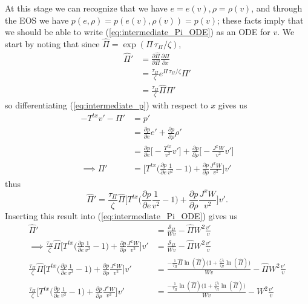 \documentclass[12pt]{article}
\numberwithin{equation}{section}
\begin{document}
At this stage we can recognize that we have $e = e(v), \rho = \rho(v)$, and through the EOS we have $p(e, \rho) = p(e(v), \rho(v)) = p(v)$; these facts imply that we should be able to write (\ref{eq:intermediate_Pi_ODE}) as an ODE for $v$.
We start by noting that since $\hat{\Pi} = \exp(\Pi \, \tau_{\Pi}/\zeta)$,
\begin{equation}
\begin{aligned}
\hat{\Pi}' &= \frac{\partial \hat{\Pi}}{\partial \Pi} \frac{\partial \Pi}{\partial x} \\
&= \frac{\tau_{\Pi}}{\zeta} e^{\Pi \, \tau_{\Pi}/\zeta} \Pi' \\
&= \frac{\tau_{\Pi}}{\zeta} \hat{\Pi} \Pi'
\end{aligned}
\end{equation}
so differentiating (\ref{eq:intermediate_p}) with respect to $x$ gives us
\begin{equation}
\begin{aligned}
- T^{tx} v' - \Pi' &= p' \\
&= \frac{\partial p}{\partial e} e' + \frac{\partial p}{\partial \rho} \rho' \\
&= \frac{\partial p}{\partial e} \Big[ - \frac{T^{tx}}{v^2} v' \Big] + \frac{\partial p}{\partial \rho} \Big[ - \frac{J^x W}{v^2} v' \Big] \\
\implies \Pi' &= \Big[ T^{tx} \Big( \frac{\partial p}{\partial e} \frac{1}{v^2} - 1 \Big) + \frac{\partial p}{\partial \rho} \frac{J^x W}{v^2} \Big] v'
\end{aligned}
\end{equation}
thus
\begin{equation}
\hat{\Pi}' = \frac{\tau_{\Pi}}{\zeta} \hat{\Pi} \Big[ T^{tx} \Big( \frac{\partial p}{\partial e} \frac{1}{v^2} - 1 \Big) + \frac{\partial p}{\partial \rho} \frac{J^x W}{v^2} \Big] v'.
\end{equation}
Inserting this result into (\ref{eq:intermediate_Pi_ODE}) gives us
\begin{equation}
\begin{aligned}
\hat{\Pi}' &= \frac{\mathcal{S}_\Pi}{W v} - \hat{\Pi} W^2 \frac{v'}{v} \\
\implies \frac{\tau_{\Pi}}{\zeta} \hat{\Pi} \Big[ T^{tx} \Big( \frac{\partial p}{\partial e} \frac{1}{v^2} - 1 \Big) + \frac{\partial p}{\partial \rho} \frac{J^x W}{v^2} \Big] v' &= \frac{\mathcal{S}_\Pi}{W v} - \hat{\Pi} W^2 \frac{v'}{v} \\
\frac{\tau_{\Pi}}{\zeta} \hat{\Pi} \Big[ T^{tx} \Big( \frac{\partial p}{\partial e} \frac{1}{v^2} - 1 \Big) + \frac{\partial p}{\partial \rho} \frac{J^x W}{v^2} \Big] v' &= \frac{- \frac{1}{\tau_\Pi} \hat{\Pi} \ln(\hat{\Pi}) \Big( 1 + \frac{\zeta \lambda}{\tau_\Pi} \ln(\hat{\Pi}) \Big)}{W v} - \hat{\Pi} W^2 \frac{v'}{v} \\
\frac{\tau_{\Pi}}{\zeta} \Big[ T^{tx} \Big( \frac{\partial p}{\partial e} \frac{1}{v^2} - 1 \Big) + \frac{\partial p}{\partial \rho} \frac{J^x W}{v^2} \Big] v' &= \frac{- \frac{1}{\tau_\Pi} \ln(\hat{\Pi}) \Big( 1 + \frac{\zeta \lambda}{\tau_\Pi} \ln(\hat{\Pi}) \Big)}{W v} - W^2 \frac{v'}{v} \\
\end{aligned}
\end{equation}
\end{document}
